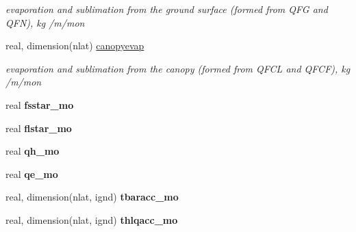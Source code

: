 \begin{DoxyCompactItemize}
\begin{DoxyCompactList}\small\item\em evaporation and sublimation from the ground surface (formed from Q\+F\+G and Q\+F\+N), kg /m/mon \end{DoxyCompactList}\item 
\hypertarget{structctem__statevars_1_1class__moyr__output_a6c8a2d02d531bf12a7007c68a3b5fa39}{}real, dimension(nlat) \hyperlink{structctem__statevars_1_1class__moyr__output_a6c8a2d02d531bf12a7007c68a3b5fa39}{canopyevap}\label{structctem__statevars_1_1class__moyr__output_a6c8a2d02d531bf12a7007c68a3b5fa39}

\begin{DoxyCompactList}\small\item\em evaporation and sublimation from the canopy (formed from Q\+F\+C\+L and Q\+F\+C\+F), kg /m/mon \end{DoxyCompactList}\item 
\hypertarget{structctem__statevars_1_1class__moyr__output_a778525103dcfd23a35e157482c7b4621}{}real {\bfseries fsstar\+\_\+mo}\label{structctem__statevars_1_1class__moyr__output_a778525103dcfd23a35e157482c7b4621}

\item 
\hypertarget{structctem__statevars_1_1class__moyr__output_adf85805abf59dcc217a1d7094fbbb5b1}{}real {\bfseries flstar\+\_\+mo}\label{structctem__statevars_1_1class__moyr__output_adf85805abf59dcc217a1d7094fbbb5b1}

\item 
\hypertarget{structctem__statevars_1_1class__moyr__output_ae2c30cee09903b5d41248e1febf1eb17}{}real {\bfseries qh\+\_\+mo}\label{structctem__statevars_1_1class__moyr__output_ae2c30cee09903b5d41248e1febf1eb17}

\item 
\hypertarget{structctem__statevars_1_1class__moyr__output_a73a2b36ed0b57abc37d444b6a7585d80}{}real {\bfseries qe\+\_\+mo}\label{structctem__statevars_1_1class__moyr__output_a73a2b36ed0b57abc37d444b6a7585d80}

\item 
\hypertarget{structctem__statevars_1_1class__moyr__output_a43c4161796ed635a0ef204cf6bcc9ad0}{}real, dimension(nlat, ignd) {\bfseries tbaracc\+\_\+mo}\label{structctem__statevars_1_1class__moyr__output_a43c4161796ed635a0ef204cf6bcc9ad0}

\item 
\hypertarget{structctem__statevars_1_1class__moyr__output_ac21020737da97d8851b55d2bf3b4ea3b}{}real, dimension(nlat, ignd) {\bfseries thlqacc\+\_\+mo}\label{structctem__statevars_1_1class__moyr__output_ac21020737da97d8851b55d2bf3b4ea3b}


\end{DoxyCompactItemize}
